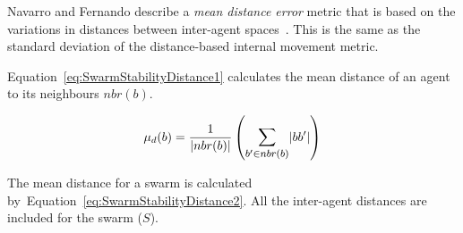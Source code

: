 \documentclass{ieeeaccess}
\begin{document}

Navarro and Fernando describe a \textit{mean distance error} metric that is
based on the variations in distances between inter-agent spaces~\cite{NIM:09}.
This is the same as the standard deviation of the distance-based internal
movement metric. 



Equation~\ref{eq:SwarmStabilityDistance1} calculates the mean distance of an agent to its neighbours $nbr(b)$. 

\begin{equation}
\label{eq:SwarmStabilityDistance1}
\mu_d(b) = \frac{1}{\mathlarger{|nbr(b)|}}\left({\mathlarger{\sum_{b' \in nbr(b)}}|bb'|}\right)
\end{equation}

The mean distance for a swarm is calculated
by~Equation~\ref{eq:SwarmStabilityDistance2}. All the inter-agent distances are
included for the swarm ($S$). 

\end{document}
